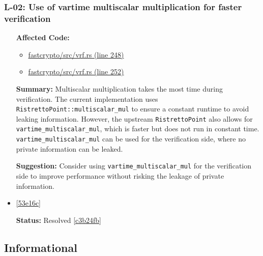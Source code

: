 \subsubsection*{L-02: Use of vartime multiscalar multiplication for faster verification}
\begin{itemize}[align=left]
\item[\textbf{Affected Code:}] \
\begin{itemize}
\item \href{https://github.com/MystenLabs/fastcrypto/blob/963205c6d0538fe548b8b10037cf87a53af6f424/fastcrypto/src/vrf.rs#L248}{fastcrypto/src/vrf.rs (line 248)}
\item \href{https://github.com/MystenLabs/fastcrypto/blob/963205c6d0538fe548b8b10037cf87a53af6f424/fastcrypto/src/vrf.rs#L252}{fastcrypto/src/vrf.rs (line 252)}
\end{itemize}
\item[\textbf{Summary:}] Multiscalar multiplication takes the most time during verification. The current implementation uses \lstinline{RistrettoPoint::multiscalar_mul} to ensure a constant runtime to avoid leaking information. However, the upstream \lstinline{RistrettoPoint} also allows for \lstinline{vartime_multiscalar_mul}, which is faster but does not run in constant time. \lstinline{vartime_multiscalar_mul} can be used for the verification side, where no private information can be leaked.
\item[\textbf{Suggestion:}] Consider using \lstinline{vartime_multiscalar_mul} for the verification side to improve performance without risking the leakage of private information.
\item[\textbf{Suggested Fix:}] \href{https://github.com/MystenLabs/fastcrypto/pull/543/commits/53e16c8f82d63a84cdc842d93fc5c26cebbe109b}{[53e16c]}
\item[\textbf{Status:}] Resolved \href{https://github.com/MystenLabs/fastcrypto/commit/c3b24fb38d00b54e9337687d9086e913e636d40b}{[c3b24fb]}
\end{itemize}

\subsection{Informational}
